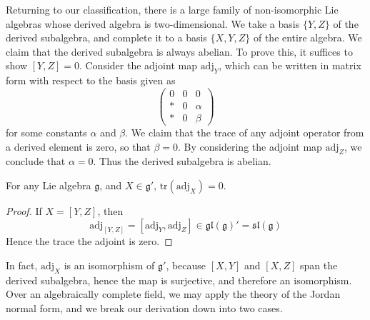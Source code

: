 Returning to our classification, there is a large family of non-isomorphic Lie algebras whose derived algebra is two-dimensional. We take a basis $\{ Y,Z \}$ of the derived subalgebra, and complete it to a basis $\{ X,Y,Z \}$ of the entire algebra. We claim that the derived subalgebra is always abelian. To prove this, it suffices to show $[Y,Z] = 0$. Consider the adjoint map $\text{adj}_Y$, which can be written in matrix form with respect to the basis given as
%
\[ \begin{pmatrix} 0 & 0 & 0 \\ * & 0 & \alpha \\ * & 0 & \beta \end{pmatrix} \]
%
for some constants $\alpha$ and $\beta$. We claim that the trace of any adjoint operator from a derived element is zero, so that $\beta = 0$. By considering the adjoint map $\text{adj}_Z$, we conclude that $\alpha = 0$. Thus the derived subalgebra is abelian.

\begin{lemma}
    For any Lie algebra $\mathfrak{g}$, and $X \in \mathfrak{g}'$, $\text{tr}(\text{adj}_X) = 0$.
\end{lemma}
\begin{proof}
    If $X = [Y,Z]$, then
    \[ \text{adj}_{[Y,Z]} = [\text{adj}_Y, \text{adj}_Z] \in \mathfrak{gl}(\mathfrak{g})' = \mathfrak{sl}(\mathfrak{g}) \]
    Hence the trace the adjoint is zero.
\end{proof}

In fact, $\text{adj}_X$ is an isomorphism of $\mathfrak{g}'$, because $[X,Y]$ and $[X,Z]$ span the derived subalgebra, hence the map is surjective, and therefore an isomorphism. Over an algebraically complete field, we may apply the theory of the Jordan normal form, and we break our derivation down into two cases.

